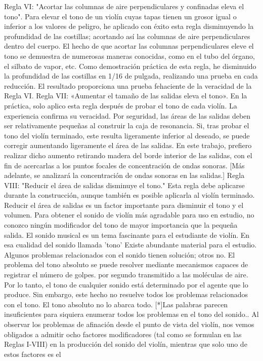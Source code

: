 Regla VI: "Acortar las columnas de aire perpendiculares y confinadas eleva el tono". Para elevar el tono de un violín cuyas tapas tienen un grosor igual o inferior a los valores de peligro, he aplicado con éxito esta regla disminuyendo la profundidad de las costillas; acortando así las columnas de aire perpendiculares dentro del cuerpo. El hecho de que acortar las columnas perpendiculares eleve el tono se demuestra de numerosas maneras conocidas, como en el tubo del órgano, el silbato de vapor, etc. Como demostración práctica de esta regla, he disminuido la profundidad de las costillas en 1/16 de pulgada, realizando una prueba en cada reducción. El resultado proporciona una prueba fehaciente de la veracidad de la Regla VI.
Regla VII: «Aumentar el tamaño de las salidas eleva el tono». En la práctica, solo aplico esta regla después de probar el tono de cada violín. La experiencia confirma su veracidad. Por seguridad, las áreas de las salidas deben ser relativamente pequeñas al construir la caja de resonancia. Si, tras probar el tono del violín terminado, este resulta ligeramente inferior al deseado, se puede corregir aumentando ligeramente el área de las salidas. En este trabajo, prefiero realizar dicho aumento retirando madera del borde interior de las salidas, con el fin de acercarlas a los puntos focales de concentración de ondas sonoras. [Más adelante, se analizará la concentración de ondas sonoras en las salidas.]
Regla VIII: "Reducir el área de salidas disminuye el tono." Esta regla debe aplicarse durante la construcción, aunque también es posible aplicarla al violín terminado. Reducir el área de salidas es un factor importante para disminuir el tono y el volumen. Para obtener el sonido de violín más agradable para uso en estudio, no conozco ningún modificador del tono de mayor importancia que la pequeña
salida.
El sonido musical es un tema fascinante para el estudiante de violín. En esa cualidad del sonido llamada 'tono'
Existe abundante material para el estudio. Algunos problemas relacionados con el sonido tienen solución; otros no. El problema del tono absoluto se puede resolver mediante mecanismos capaces de registrar el número de golpes.
por segundo transmitido a las moléculas de aire. Por lo tanto, el tono de cualquier sonido está determinado por el agente que lo produce. Sin embargo, este hecho no resuelve todos los problemas relacionados con el tono. El tono absoluto no lo abarca todo. [*]Las palabras parecen insuficientes para siquiera enumerar todos los problemas en el tono del sonido.. Al observar los problemas de afinación desde el punto de vista del violín, nos vemos obligados a admitir ocho factores modificadores (tal como se formulan en las Reglas I-VIII) en la producción del sonido del violín, mientras que solo uno de estos factores es el
